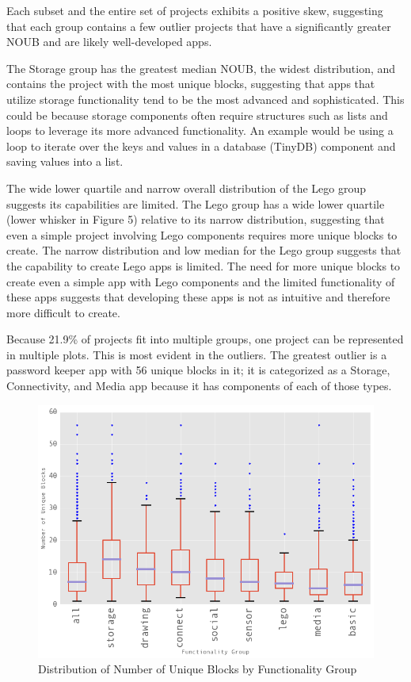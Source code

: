 \documentclass[conference]{IEEEtran}
\begin{document}
Each subset and the entire set of projects exhibits a positive skew, suggesting that each group contains a few outlier projects that have a significantly greater NOUB and are likely well-developed apps.

The Storage group has the greatest median NOUB, the widest distribution, and contains the project with the most unique blocks, suggesting that apps that utilize storage functionality tend to be the most advanced and sophisticated. This could be because storage components often require structures such as lists and loops to leverage its more advanced functionality. An example would be using a loop to iterate over the keys and values in a database (TinyDB) component and saving values into a list.  

The wide lower quartile and narrow overall distribution of the Lego group suggests its capabilities are limited. The Lego group has a wide lower quartile (lower whisker in Figure 5) relative to its narrow distribution, suggesting that even a simple project involving Lego components requires more unique blocks to create. The narrow distribution and low median for the Lego group suggests that the capability to create Lego apps is limited. The need for more unique blocks to create even a simple app with Lego components and the limited functionality of these apps suggests that developing these apps is not as intuitive and therefore more difficult to create.

Because 21.9\% of projects fit into multiple groups, one project can be represented in multiple plots. This is most evident in the outliers. The greatest outlier is a password keeper app with 56 unique blocks in it; it is categorized as a Storage, Connectivity, and Media app because it has components of each of those types.



\begin{figure}[h!]
	\centering
	\includegraphics[width=1\linewidth]{boxplot.png}
	\caption{Distribution of Number of Unique Blocks by Functionality Group}
	\label{Distribution of Num of Unique Blocks}
\end{figure}
\end{document}
